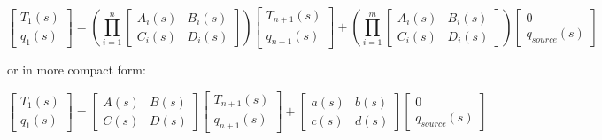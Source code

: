 \begin{equation}
\left[ {\begin{array}{*{20}{c}}{{T_1}\left( s \right)}\\ {{q_1}\left( s \right)}\end{array}} \right] = \left( {\prod\limits_{i = 1}^n {\left[ {\begin{array}{*{20}{c}}{{A_i}\left( s \right)}&{{B_i}\left( s \right)}\\ {{C_i}\left( s \right)}&{{D_i}\left( s \right)}\end{array}} \right]} } \right)\left[ {\begin{array}{*{20}{c}}{{T_{n + 1}}\left( s \right)}\\ {{q_{n + 1}}\left( s \right)}\end{array}} \right] + \left( {\prod\limits_{i = 1}^m {\left[ {\begin{array}{*{20}{c}}{{A_i}\left( s \right)}&{{B_i}\left( s \right)}\\ {{C_i}\left( s \right)}&{{D_i}\left( s \right)}\end{array}} \right]} } \right)\left[ {\begin{array}{*{20}{c}}0\\ {{q_{source}}\left( s \right)}\end{array}} \right]
\end{equation}

or in more compact form:

\begin{equation}
\left[ {\begin{array}{*{20}{c}}{{T_1}\left( s \right)}\\ {{q_1}\left( s \right)}\end{array}} \right] = \left[ {\begin{array}{*{20}{c}}{A\left( s \right)}&{B\left( s \right)}\\ {C\left( s \right)}&{D\left( s \right)}\end{array}} \right]\left[ {\begin{array}{*{20}{c}}{{T_{n + 1}}\left( s \right)}\\ {{q_{n + 1}}\left( s \right)}\end{array}} \right] + \left[ {\begin{array}{*{20}{c}}{a\left( s \right)}&{b\left( s \right)}\\ {c\left( s \right)}&{d\left( s \right)}\end{array}} \right]\left[ {\begin{array}{*{20}{c}}0\\ {{q_{source}}\left( s \right)}\end{array}} \right]
\end{equation}

